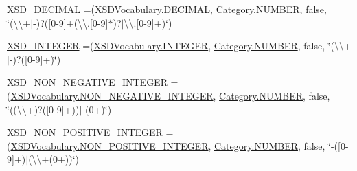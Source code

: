 \begin{DoxyCompactItemize}
\item 
\hyperlink{enumorg_1_1semanticweb_1_1owlapi_1_1vocab_1_1_o_w_l2_datatype_a3019a80060958588d9bb648054c395f1}{X\-S\-D\-\_\-\-D\-E\-C\-I\-M\-A\-L} =(\hyperlink{enumorg_1_1semanticweb_1_1owlapi_1_1vocab_1_1_x_s_d_vocabulary_a47718a7834afe795fe710a3634918915}{X\-S\-D\-Vocabulary.\-D\-E\-C\-I\-M\-A\-L}, \hyperlink{enumorg_1_1semanticweb_1_1owlapi_1_1vocab_1_1_o_w_l2_datatype_1_1_category_a97ce57869179b750ad9ff9751e8f96b4}{Category.\-N\-U\-M\-B\-E\-R}, false, \char`\"{}(\textbackslash{}\textbackslash{}+$|$-\/)?(\mbox{[}0-\/9\mbox{]}+(\textbackslash{}\textbackslash{}.\mbox{[}0-\/9\mbox{]}$\ast$)?$|$\textbackslash{}\textbackslash{}.\mbox{[}0-\/9\mbox{]}+)\char`\"{})
\item 
\hyperlink{enumorg_1_1semanticweb_1_1owlapi_1_1vocab_1_1_o_w_l2_datatype_a03ade2b5ecbab9b6b53e4ac8f4c76f9d}{X\-S\-D\-\_\-\-I\-N\-T\-E\-G\-E\-R} =(\hyperlink{enumorg_1_1semanticweb_1_1owlapi_1_1vocab_1_1_x_s_d_vocabulary_a5832ea5dd54356a15a6146491737a68b}{X\-S\-D\-Vocabulary.\-I\-N\-T\-E\-G\-E\-R}, \hyperlink{enumorg_1_1semanticweb_1_1owlapi_1_1vocab_1_1_o_w_l2_datatype_1_1_category_a97ce57869179b750ad9ff9751e8f96b4}{Category.\-N\-U\-M\-B\-E\-R}, false, \char`\"{}(\textbackslash{}\textbackslash{}+$|$-\/)?(\mbox{[}0-\/9\mbox{]}+)\char`\"{})
\item 
\hyperlink{enumorg_1_1semanticweb_1_1owlapi_1_1vocab_1_1_o_w_l2_datatype_a285feaa7b6495f1906c08f0100bb4481}{X\-S\-D\-\_\-\-N\-O\-N\-\_\-\-N\-E\-G\-A\-T\-I\-V\-E\-\_\-\-I\-N\-T\-E\-G\-E\-R} =(\hyperlink{enumorg_1_1semanticweb_1_1owlapi_1_1vocab_1_1_x_s_d_vocabulary_acd9ce97bae19edd81ff64e3fd7c9e2a2}{X\-S\-D\-Vocabulary.\-N\-O\-N\-\_\-\-N\-E\-G\-A\-T\-I\-V\-E\-\_\-\-I\-N\-T\-E\-G\-E\-R}, \hyperlink{enumorg_1_1semanticweb_1_1owlapi_1_1vocab_1_1_o_w_l2_datatype_1_1_category_a97ce57869179b750ad9ff9751e8f96b4}{Category.\-N\-U\-M\-B\-E\-R}, false, \char`\"{}((\textbackslash{}\textbackslash{}+)?(\mbox{[}0-\/9\mbox{]}+))$|$-\/(0+)\char`\"{})
\item 
\hyperlink{enumorg_1_1semanticweb_1_1owlapi_1_1vocab_1_1_o_w_l2_datatype_af65a8cc59b8e700a36ba9f2ea5a91181}{X\-S\-D\-\_\-\-N\-O\-N\-\_\-\-P\-O\-S\-I\-T\-I\-V\-E\-\_\-\-I\-N\-T\-E\-G\-E\-R} =(\hyperlink{enumorg_1_1semanticweb_1_1owlapi_1_1vocab_1_1_x_s_d_vocabulary_aadf460c1a0c3baa23b1482c8ce7d4631}{X\-S\-D\-Vocabulary.\-N\-O\-N\-\_\-\-P\-O\-S\-I\-T\-I\-V\-E\-\_\-\-I\-N\-T\-E\-G\-E\-R}, \hyperlink{enumorg_1_1semanticweb_1_1owlapi_1_1vocab_1_1_o_w_l2_datatype_1_1_category_a97ce57869179b750ad9ff9751e8f96b4}{Category.\-N\-U\-M\-B\-E\-R}, false, \char`\"{}-\/(\mbox{[}0-\/9\mbox{]}+)$|$(\textbackslash{}\textbackslash{}+(0+))\char`\"{})

\end{DoxyCompactItemize}
